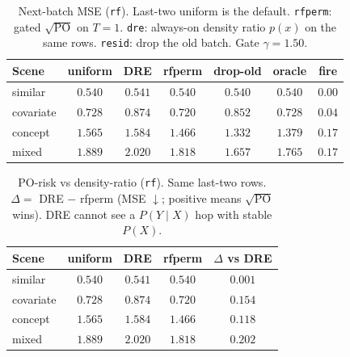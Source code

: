 

\begin{table}[ht]\centering
\caption{Next-batch MSE (\texttt{rf}). Last-two uniform is the
default. \texttt{rfperm}: gated $\sqrt{\mathrm{PO}}$ on $T=1$.
\texttt{dre}: always-on density ratio $p(x)$ on the same rows.
\texttt{resid}: drop the old batch. Gate $\gamma=1.50$.}
\label{tab:po-refit-mse-rf}
\small
\setlength{\tabcolsep}{3.5pt}
\begin{tabular}{@{}lcccccc@{}}\toprule
Scene & uniform & DRE & rfperm & drop-old & oracle & fire \\
\midrule
similar & $\mathbf{0.540}$ & $0.541$ & $\mathbf{0.540}$ & $\mathbf{0.540}$ & $0.540$ & $0.00$ \\
covariate & $0.728$ & $0.874$ & $\mathbf{0.720}$ & $0.852$ & $0.728$ & $0.04$ \\
concept & $1.565$ & $1.584$ & $1.466$ & $\mathbf{1.332}$ & $1.379$ & $0.17$ \\
mixed & $1.889$ & $2.020$ & $1.818$ & $\mathbf{1.657}$ & $1.765$ & $0.17$ \\
\bottomrule
\end{tabular}
\end{table}

\begin{table}[ht]\centering
\caption{PO-risk vs density-ratio (\texttt{rf}).
Same last-two rows. $\Delta=$ DRE $-$ rfperm (MSE $\downarrow$;
positive means $\sqrt{\mathrm{PO}}$ wins). DRE cannot see a
$P(Y\mid X)$ hop with stable $P(X)$.}
\label{tab:po-vs-dre-rf}
\small
\begin{tabular}{@{}lcccc@{}}\toprule
Scene & uniform & DRE & rfperm & $\Delta$ vs DRE \\
\midrule
similar & $0.540$ & $0.541$ & $0.540$ & $0.001$ \\
covariate & $0.728$ & $0.874$ & $0.720$ & $\mathbf{0.154}$ \\
concept & $1.565$ & $1.584$ & $1.466$ & $\mathbf{0.118}$ \\
mixed & $1.889$ & $2.020$ & $1.818$ & $\mathbf{0.202}$ \\
\bottomrule
\end{tabular}
\end{table}

